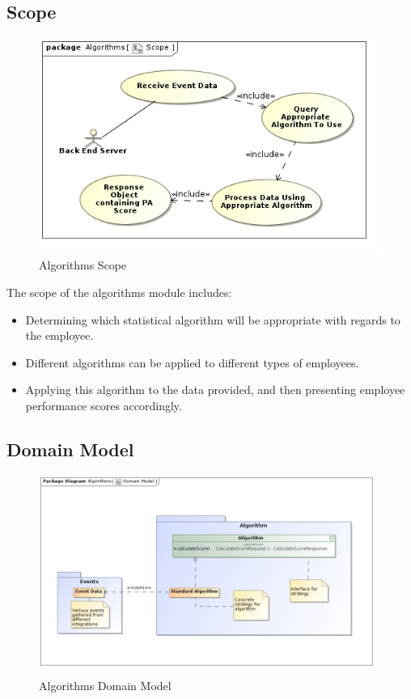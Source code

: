 \documentclass[11pt,a4paper]{article}
\begin{document}
\subsection{Scope}
\begin{figure}[H]
	\begin{center}
		\includegraphics[width=\linewidth]{../Images/Algorithms Scope.jpg}
		\caption{Algorithms Scope}
	\end{center}
\end{figure}
The scope of the algorithms module includes:
\begin{itemize}
	\item Determining which statistical algorithm will be appropriate with regards to the employee. 
	
	\item Different algorithms can be applied to different types of employees.
	
	\item Applying this algorithm to the data provided, and then presenting employee performance scores accordingly.
\end{itemize}

\subsection{Domain Model}
\begin{figure}[H]
	\begin{center}
		\includegraphics[width=\linewidth]{../Images/Algorithms_Domain_Model.jpg}
		\caption{Algorithms Domain Model}
	\end{center}
\end{figure}
\end{document}
